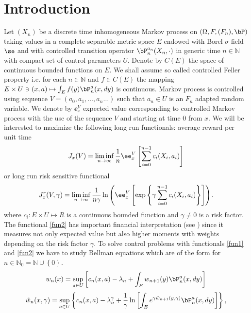 \documentclass[10pt,english]{extarticle}
\begin{document}
\section{Introduction}\label{S:introduction}
Let $(X_n)$ be a discrete time inhomogeneous Markov process on $(\Omega, F,(F_n),\bP)$ taking values in a complete separable metric space  $E$ endowed with Borel $\sigma$ field $\se$ and with controlled transition operator $\bP_n^{a_n}(X_n,\cdot)$ in generic time $n\in \mathbb{N}$ with compact set of control parameters $U$. Denote by $C(E)$ the space of continuous bounded functions on $E$.  We shall assume so called controlled Feller property i.e. for each $n\in \mathbb{N}$ and $f\in C(E)$ the mapping $E\times U\ni (x,a)\mapsto \int_E f(y)\bP_n^a(x,dy)$ is continuous.  Markov process is controlled using sequence $V=(a_0,a_1,\ldots, a_n\ldots)$ such that $a_n\in U$ is an $F_n$ adapted random variable. We denote by $\ee_{x}^V$ expected value corresponding to controlled Markov process with the use of the sequence $V$ and starting at time $0$ from $x$. We will be interested to maximize the following long run functionals: average reward per unit time
\begin{equation}\label{fun1}
J_x(V)=\liminf_{n\to \infty} {1\over n} \ee_x^V\left[\sum_{i=0}^{n-1}c_i(X_{i},a_{i})\right]
\end{equation}
or long run risk sensitive functional
\begin{equation} \label{fun2}
J_{x}^r(V,\gamma)=\liminf_{n\to \infty}{1 \over n \gamma}  \ln\left( \ee_x^V\left[\exp\left\{\gamma\sum_{i=0}^{n-1}c_i(X_{i},a_{i})\right\}\right]\right).
\end{equation}
where $c_i:E\times U\mapsto R$ is a continuous bounded function and $\gamma\neq 0$ is a risk factor. The functional \eqref{fun2} has important financial interpretation (see \cite{PitSte2022}) since it measures not only expected value but also higher moments with weights depending on the risk factor $\gamma$.  
To solve control problems with functionals \eqref{fun1} and \eqref{fun2} we have to study Bellman equations which are of the form for $n\in \mathbb{N}_0=\mathbb{N}\cup\left\{0\right\}$.
\begin{equation}\label{Bel1}
w_n(x)=\sup_{a\in U}\left[c_n(x,a)-\lambda_n +\int_E w_{n+1}(y)\bP_n^a(x,dy)\right]
\end{equation}
\begin{equation}\label{Bel2}
\tilde{w}_n(x,\gamma)=\sup_{a\in U} \left\{c_n(x,a)-\lambda_n^\gamma+  {1\over \gamma}\ln\left[ \int_E e^{\gamma \tilde{w}_{n+1}(y,\gamma)}\bP_n^a(x,dy)\right]\right\},
\end{equation}
\end{document}
